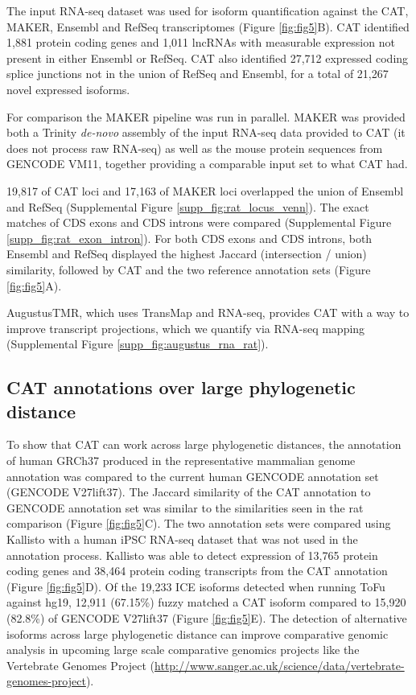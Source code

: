 \documentclass[fleqn,10pt]{wlscirep}
\begin{document}
The input RNA-seq dataset was used for isoform quantification against the CAT, MAKER, Ensembl and RefSeq transcriptomes (Figure \ref{fig:fig5}B). CAT identified 1,881 protein coding genes and 1,011 lncRNAs with measurable expression not present in either Ensembl or RefSeq. CAT also identified 27,712 expressed coding splice junctions not in the union of RefSeq and Ensembl, for a total of 21,267 novel expressed isoforms.

For comparison the MAKER pipeline \cite{cantarel2008maker} was run in parallel. MAKER was provided both a Trinity \cite{haas2013novo} \textit{de-novo} assembly of the input RNA-seq data provided to CAT (it does not process raw RNA-seq) as well as the mouse protein sequences from GENCODE VM11, together providing a comparable input set to what CAT had. 

19,817 of CAT loci and 17,163 of MAKER loci overlapped the union of Ensembl and RefSeq (Supplemental Figure \ref{supp_fig:rat_locus_venn}). The exact matches of CDS exons and CDS introns were compared (Supplemental Figure \ref{supp_fig:rat_exon_intron}). For both CDS exons and CDS introns, both Ensembl and RefSeq displayed the highest Jaccard (intersection / union) similarity, followed by CAT and the two reference annotation sets (Figure \ref{fig:fig5}A).

AugustusTMR, which uses TransMap and RNA-seq, provides CAT with a way to improve transcript projections, which we quantify via RNA-seq mapping (Supplemental Figure \ref{supp_fig:augustus_rna_rat}).


\subsection*{CAT annotations over large phylogenetic distance}
To show that CAT can work across large phylogenetic distances, the annotation of human GRCh37 produced in the representative mammalian genome annotation was compared to the current human GENCODE annotation set (GENCODE V27lift37). The Jaccard similarity of the CAT annotation to GENCODE annotation set was similar to the similarities seen in the rat comparison (Figure \ref{fig:fig5}C). The two annotation sets were compared using Kallisto with a human iPSC RNA-seq dataset that was not used in the annotation process. Kallisto was able to detect expression of 13,765 protein coding genes and 38,464 protein coding transcripts from the CAT annotation (Figure \ref{fig:fig5}D). Of the 19,233 ICE isoforms detected when running ToFu \cite{gordon2015widespread} against hg19, 12,911 (67.15\%) fuzzy matched a CAT isoform compared to 15,920 (82.8\%) of GENCODE V27lift37 (Figure \ref{fig:fig5}E). The detection of alternative isoforms across large phylogenetic distance can improve comparative genomic analysis in upcoming large scale comparative genomics projects like the Vertebrate Genomes Project \cite{haussler2009genome} (\url{http://www.sanger.ac.uk/science/data/vertebrate-genomes-project}).
\end{document}
